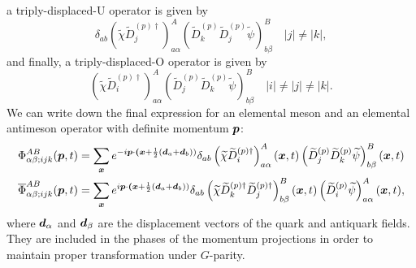     a triply-displaced-U operator is given by
    \begin{equation}
        \delta_{a b}\left(\widetilde{\chi} \widetilde{D}_{j}^{(p) \dagger}\right)_{a \alpha}^{A}\left(\widetilde{D}_{k}^{(p)} \widetilde{D}_{j}^{(p)} \widetilde{\psi}\right)_{b \beta}^{B} \quad|j| \neq|k|,
    \end{equation}
    and finally, a triply-displaced-O operator is given by
    \begin{equation}
        \left(\widetilde{\chi} \widetilde{D}_{i}^{(p) \dagger}\right)_{a \alpha}^{A}\left(\widetilde{D}_{j}^{(p)} \widetilde{D}_{k}^{(p)} \widetilde{\psi}\right)_{b \beta}^{B} \quad|i| \neq|j| \neq|k|.
    \end{equation}
    We can write down the final expression for an elemental meson and an elemental antimeson operator with definite momentum $\boldsymbol{p}$:
    \begin{equation}
        \begin{aligned}
            \Phi_{\alpha \beta ; i j k}^{A B}(\boldsymbol{p}, t)&=\sum_{\boldsymbol{x}} e^{-i\boldsymbol{p} \cdot \boldsymbol{(}\boldsymbol{x}+\frac{1}{2}(\boldsymbol{d}_a + \boldsymbol{d}_b))}\delta_{a b}\left(\widetilde{\chi} \widetilde{D}_{i}^{(p) \dagger}\right)_{a \alpha}^{A}(\boldsymbol{x}, t)\left(\widetilde{D}_{j}^{(p)} \widetilde{D}_{k}^{(p)} \widetilde{\psi}\right)_{b \beta}^{B}(\boldsymbol{x}, t) \\
            \overline{\Phi}_{\alpha \beta ; i j k}^{A B}(\boldsymbol{p}, t)&=\sum_{\boldsymbol{x}} e^{i\boldsymbol{p} \cdot \boldsymbol{(}\boldsymbol{x}+\frac{1}{2}(\boldsymbol{d}_a + \boldsymbol{d}_b))}\delta_{a b}\left(\widetilde{\chi} \widetilde{D}_{k}^{(p) \dagger} \widetilde{D}_{j}^{(p) \dagger}\right)_{b \beta}^{B}(\boldsymbol{x}, t)\left(\widetilde{D}_{i}^{(p)} \widetilde{\psi}\right)_{a \alpha}^{A}(\boldsymbol{x}, t),
        \end{aligned}
    \end{equation}
    where $\boldsymbol{d}_\alpha$ and $\boldsymbol{d}_\beta$ are the displacement vectors of the quark and antiquark fields. They are included in the phases of the momentum projections in order to maintain proper transformation under $G$-parity.
